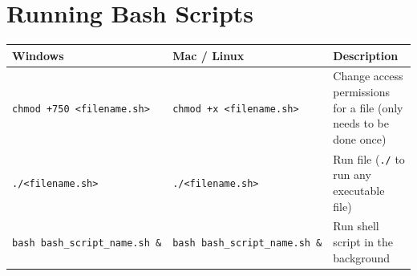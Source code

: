 \documentclass[]{book}
\begin{document}
\hypertarget{running-bash-scripts}{%
\section{Running Bash Scripts}\label{running-bash-scripts}}

\begin{longtable}[]{@{}lll@{}}
\toprule
\begin{minipage}[b]{0.23\columnwidth}\raggedright
Windows\strut
\end{minipage} & \begin{minipage}[b]{0.34\columnwidth}\raggedright
Mac / Linux\strut
\end{minipage} & \begin{minipage}[b]{0.34\columnwidth}\raggedright
Description\strut
\end{minipage}\tabularnewline
\midrule
\endhead
\begin{minipage}[t]{0.23\columnwidth}\raggedright
\texttt{chmod\ +750\ \textless{}filename.sh\textgreater{}}\strut
\end{minipage} & \begin{minipage}[t]{0.34\columnwidth}\raggedright
\texttt{chmod\ +x\ \textless{}filename.sh\textgreater{}}\strut
\end{minipage} & \begin{minipage}[t]{0.34\columnwidth}\raggedright
Change access permissions for a file (only needs to be done once)\strut
\end{minipage}\tabularnewline
\begin{minipage}[t]{0.23\columnwidth}\raggedright
\texttt{./\textless{}filename.sh\textgreater{}}\strut
\end{minipage} & \begin{minipage}[t]{0.34\columnwidth}\raggedright
\texttt{./\textless{}filename.sh\textgreater{}}\strut
\end{minipage} & \begin{minipage}[t]{0.34\columnwidth}\raggedright
Run file (\texttt{./} to run any executable file)\strut
\end{minipage}\tabularnewline
\begin{minipage}[t]{0.23\columnwidth}\raggedright
\texttt{bash\ bash\_script\_name.sh\ \&}\strut
\end{minipage} & \begin{minipage}[t]{0.34\columnwidth}\raggedright
\texttt{bash\ bash\_script\_name.sh\ \&}\strut
\end{minipage} & \begin{minipage}[t]{0.34\columnwidth}\raggedright
Run shell script in the background\strut
\end{minipage}\tabularnewline
\bottomrule
\end{longtable}
\end{document}
